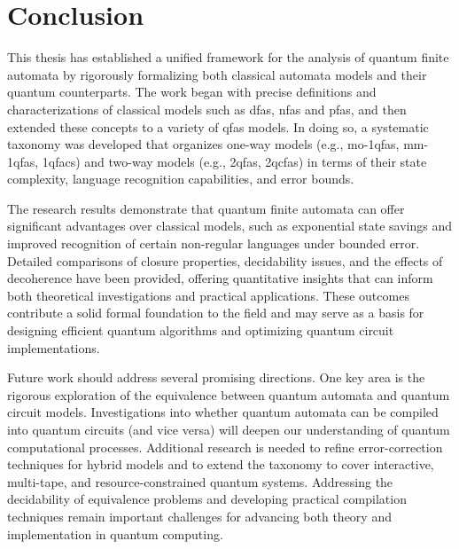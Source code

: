 \chapter{Conclusion}
\label{chap:conclusion}

This thesis has established a unified framework for the analysis of quantum finite automata by rigorously formalizing both classical automata models and their quantum counterparts. The work began with precise definitions and characterizations of classical models such as \glspl{dfa}, \glspl{nfa} and \glspl{pfa}, and then extended these concepts to a variety of \glspl{qfa} models. In doing so, a systematic taxonomy was developed that organizes one-way models (e.g., \glspl{mo-1qfa}, \glspl{mm-1qfa}, \glspl{1qfac}) and two-way models (e.g., \glspl{2qfa}, \glspl{2qcfa}) in terms of their state complexity, language recognition capabilities, and error bounds.

The research results demonstrate that quantum finite automata can offer significant advantages over classical models, such as exponential state savings and improved recognition of certain non-regular languages under bounded error. Detailed comparisons of closure properties, decidability issues, and the effects of decoherence have been provided, offering quantitative insights that can inform both theoretical investigations and practical applications. These outcomes contribute a solid formal foundation to the field and may serve as a basis for designing efficient quantum algorithms and optimizing quantum circuit implementations.

Future work should address several promising directions. One key area is the rigorous exploration of the equivalence between quantum automata and quantum circuit models. Investigations into whether quantum automata can be compiled into quantum circuits (and vice versa) will deepen our understanding of quantum computational processes. Additional research is needed to refine error-correction techniques for hybrid models and to extend the taxonomy to cover interactive, multi-tape, and resource-constrained quantum systems. Addressing the decidability of equivalence problems and developing practical compilation techniques remain important challenges for advancing both theory and implementation in quantum computing.
